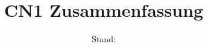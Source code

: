 



\subject{Computernetzwerke 1}
\title{CN1 Zusammenfassung}
\author{\contributors}
\date{Stand: \revisiondate}






\setcounter{section}{-1}
















